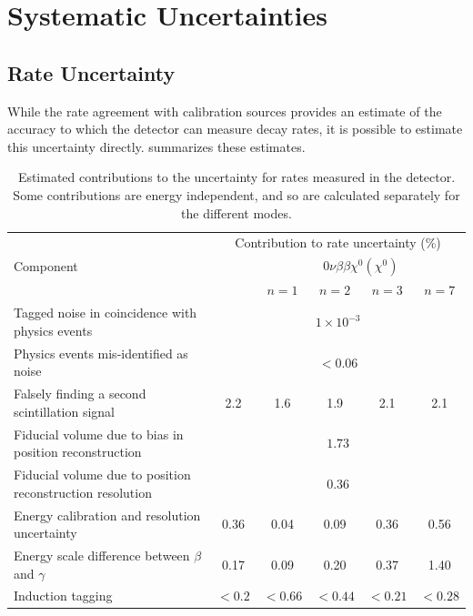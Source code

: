 \documentclass[herrin-thesis.tex]{subfiles}
\begin{document}
\section{Systematic Uncertainties}
\subsection{Rate Uncertainty}
\label{sec:analysis_rate_uncertainty}
While the rate agreement with calibration sources provides an estimate of the accuracy to which the detector can measure decay rates, it is possible to estimate this uncertainty directly.  summarizes these estimates.

\begin{table}[htp]
\centering
\caption[Contributions to systematic uncertainty]{Estimated contributions to the uncertainty for rates measured in the detector. Some contributions are energy independent, and so are calculated separately for the different modes.}
\label{tab:analysis_normalization_uncertainty}
\begin{tabular}{p{} c c c c c}\toprule
			&	\multicolumn{5}{c}{Contribution to rate uncertainty (\%)}				\\
Component	&	\twonu{}	&	\multicolumn{4}{c}{\(0\nu\beta\beta\chi^0(\chi^0)\)}		\\
			&			&	\(n = 1\)	&	\(n = 2\)	&	\(n = 3\)	&	\(n = 7\)	\\
Tagged noise in coincidence with physics events		&	\multicolumn{5}{c}{\(1\times10^{-3}\)}		\\
Physics events mis-identified as noise				&	\multicolumn{5}{c}{\(<0.06\)}				\\
Falsely finding a second scintillation signal			&	2.2	&	1.6	&	1.9	&	2.1	&	2.1	\\
Fiducial volume due to bias in position reconstruction	&	\multicolumn{5}{c}{\(1.73\)}				\\
Fiducial volume due to position reconstruction resolution	&	\multicolumn{5}{c}{\(0.36\)}				\\
Energy calibration and resolution uncertainty			&	0.36	&	0.04	&	0.09	&	0.36	&	0.56	\\
Energy scale difference between \(\beta\) and \(\gamma\)	&	0.17	&	0.09	&	0.20	&	0.37	&	1.40	\\
Induction tagging								&	\(<0.2\)&	\(<0.66\)	&	\(<0.44\)	&	\(<0.21\)	&	\(<0.28\)	\\

\end{tabular}
\end{table}
\end{document}
